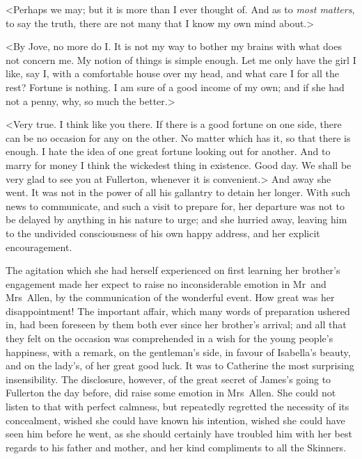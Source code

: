  <Perhaps we may; but it is more than I ever thought of. And as to \textit{most matters}, to say the truth, there are not many that I know my own mind about.> 

 <By Jove, no more do I. It is not my way to bother my brains with what does not concern me. My notion of things is simple enough. Let me only have the girl I like, say I, with a comfortable house over my head, and what care I for all the rest? Fortune is nothing. I am sure of a good income of my own; and if she had not a penny, why, so much the better.> 

 <Very true. I think like you there. If there is a good fortune on one side, there can be no occasion for any on the other. No matter which has it, so that there is enough. I hate the idea of one great fortune looking out for another. And to marry for money I think the wickedest thing in existence. Good day. We shall be very glad to see you at Fullerton, whenever it is convenient.> And away she went. It was not in the power of all his gallantry to detain her longer. With such news to communicate, and such a visit to prepare for, her departure was not to be delayed by anything in his nature to urge; and she hurried away, leaving him to the undivided consciousness of his own happy address, and her explicit encouragement. 

 The agitation which she had herself experienced on first learning her brother's engagement made her expect to raise no inconsiderable emotion in Mr~and Mrs~Allen, by the communication of the wonderful event. How great was her disappointment! The important affair, which many words of preparation ushered in, had been foreseen by them both ever since her brother's arrival; and all that they felt on the occasion was comprehended in a wish for the young people's happiness, with a remark, on the gentleman's side, in favour of Isabella's beauty, and on the lady's, of her great good luck. It was to Catherine the most surprising insensibility. The disclosure, however, of the great secret of James's going to Fullerton the day before, did raise some emotion in Mrs~Allen. She could not listen to that with perfect calmness, but repeatedly regretted the necessity of its concealment, wished she could have known his intention, wished she could have seen him before he went, as she should certainly have troubled him with her best regards to his father and mother, and her kind compliments to all the Skinners. 